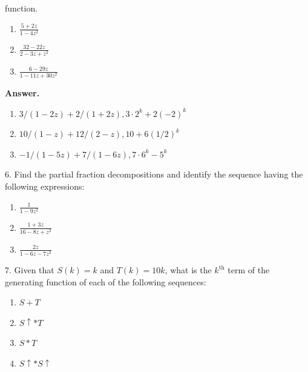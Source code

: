 \documentclass[10pt,]{book}
\theoremstyle{plain}
\theoremstyle{definition}
\theoremstyle{definition}
\theoremstyle{definition}
\theoremstyle{definition}
\numberwithin{equation}{section}
\begin{document}
\begin{exercisegroup}
function.%
\par
\leavevmode%
\begin{enumerate}[label=\alph*]
\item\hypertarget{li-129}{} \(\frac{5+2z}{1-4z^2}\)%
\item\hypertarget{li-130}{} \(\frac{32-22z}{2-3z+z^2}\)%
\item\hypertarget{li-131}{} \(\frac{6-29z}{1-11z+ 30z^2}\)%
\end{enumerate}
%
\par\smallskip
\par\smallskip
\noindent\textbf{Answer.}\hypertarget{answer-6}{}\quad
\leavevmode%
\begin{enumerate}[label=\alph*]
\item\hypertarget{li-132}{} \(3/(1-2z)+2/(1+2z), 3\cdot 2^k+2(-2)^k\)%
\item\hypertarget{li-133}{} \(10/(1-z)+12/(2-z), 10+6(1/2)^k\)%
\item\hypertarget{li-134}{} \(-1/(1-5z)+7/(1-6z), 7\cdot 6^k-5^k\)%
\end{enumerate}
%
\item[6.]\hypertarget{exercise-12}{}Find the partial fraction decompositions and identify the sequence having the following expressions:%
\par
\leavevmode%
\begin{enumerate}[label=\alph*]
\item\hypertarget{li-135}{} \(\frac{1}{1-9z^2}\)%
\item\hypertarget{li-136}{} \(\frac{1+3z}{16-8z+z^2}\)%
\item\hypertarget{li-137}{} \(\frac{2z}{1-6z-7z^2}\)%
\end{enumerate}
%
\par\smallskip
\item[7.]\hypertarget{exercise-13}{} Given that \(S(k) = k\) and \(T(k) = 10k\), what is the \(k^{\text{th}}\) term of the generating function of each of the following sequences:%
\par
\leavevmode%
\begin{enumerate}[label=\alph*]
\item\hypertarget{li-138}{}\(S + T\)%
\item\hypertarget{li-139}{}\(S\uparrow  * T\) %
\item\hypertarget{li-140}{} \(S * T\)%
\item\hypertarget{li-141}{} \(S\uparrow *S\uparrow\)%
\end{enumerate}
%
\par\smallskip

\end{exercisegroup}
\end{document}
